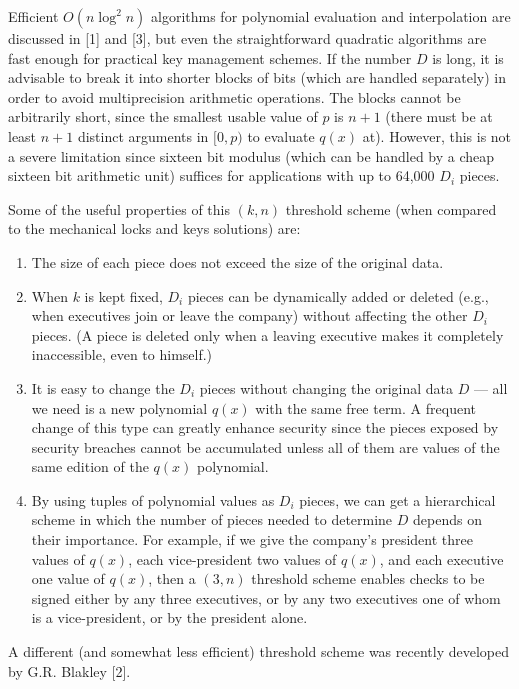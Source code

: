 Efficient $O(n \log^2 n)$ algorithms for polynomial evaluation and interpolation
are discussed in [1] and [3], but even the straightforward quadratic algorithms
are fast enough for practical key management schemes. If the number $D$ is long,
it is advisable to break it into shorter blocks of bits (which are handled separately)
in order to avoid multiprecision arithmetic operations.
The blocks cannot be arbitrarily short, since the smallest usable value
of $p$ is $n + 1$ (there must be at least $n + 1$ distinct arguments
in $[0, p)$ to evaluate $q(x)$ at). However, this is not a severe limitation
since sixteen bit modulus (which can be handled by a cheap sixteen bit arithmetic unit)
suffices for applications with up to 64,000 $D_i$ pieces.

Some of the useful properties of this $(k, n)$ threshold scheme
(when compared to the mechanical locks and keys solutions) are:

\begin{enumerate}
	\item The size of each piece does not exceed the size of the original data.
	\item When $k$ is kept fixed, $D_i$ pieces can be dynamically added or deleted
	      (e.g., when executives join or leave the company) without affecting
	      the other $D_i$ pieces. (A piece is deleted only when a leaving executive
	      makes it completely inaccessible, even to himself.)
	\item It is easy to change the $D_i$ pieces without changing the original data
	      $D$ --- all we need is a new polynomial $q(x)$ with the same free term.
	      A frequent change of this type can greatly enhance security since the
	      pieces exposed by security breaches cannot be accumulated unless all of
	      them are values of the same edition of the $q(x)$ polynomial.
	\item By using tuples of polynomial values as $D_i$ pieces, we can get a
	      hierarchical scheme in which the number of pieces needed to determine $D$
	      depends on their importance. For example, if we give the company's president
	      three values of $q(x)$, each vice-president two values of $q(x)$, and each
	      executive one value of $q(x)$, then a $(3, n)$ threshold scheme enables
	      checks to be signed either by any three executives, or by any two executives
	      one of whom is a vice-president, or by the president alone.
\end{enumerate}

A different (and somewhat less efficient) threshold scheme was recently developed by G.R. Blakley [2].

